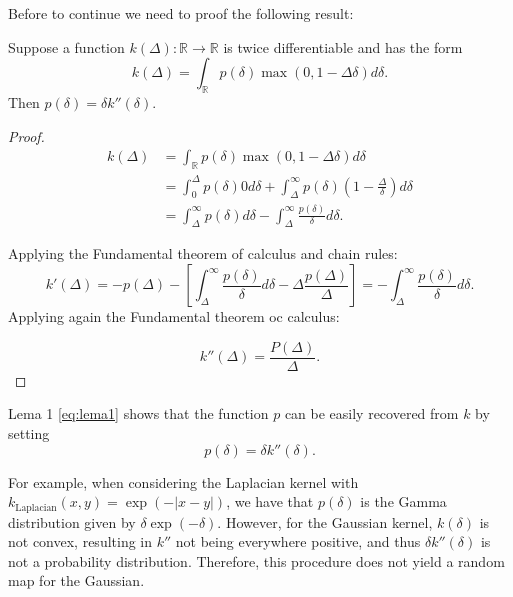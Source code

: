 Before to continue we need to proof the following result: 
\begin{lemma}
    \label{eq:lema1}
    Suppose a function $k(\Delta): \mathbb{R} \rightarrow \mathbb{R}$ is twice differentiable and has the form
    \begin{equation}
        k(\Delta) = \int_{\mathbb{R}} p(\delta) \max(0, 1-\Delta \delta) d\delta.
    \end{equation}
    Then $p(\delta) = \delta k''(\delta)$.
\end{lemma}
\begin{proof}
    \begin{align}
        k(\Delta) &= 
        \int_{\mathbb{R}} p(\delta) \max(0, 1-\Delta \delta) d\delta
        \\ 
        & = 
        \int_{0}^\Delta p(\delta) 0 d\delta
        + 
        \int_{\Delta}^\infty
            p(\delta)
            \left(1 - \frac{\Delta}{\delta}\right) 
            d \delta
        \\
        &=
        \int_{\Delta}^\infty
            p(\delta)
            d \delta
        -
        \int_{\Delta}^\infty
            \frac{p(\delta)}{\delta}
            d \delta. 
    \end{align}

Applying the Fundamental theorem of calculus and chain rules: 
\begin{equation}
   k'(\Delta)
   = 
   - p(\Delta)
   - 
   \left[
    \int_{\Delta}^\infty
            \frac{p(\delta)}{\delta}
            d \delta
    -
    \Delta \frac{p(\Delta)}{\Delta}
   \right] 
   = - \int_{\Delta}^\infty
   \frac{p(\delta)}{\delta}
   d \delta.
\end{equation}
Applying again the Fundamental theorem oc calculus: 

\begin{equation}
    k''(\Delta)
    = 
    \frac{P(\Delta)}{\Delta}. 
\end{equation}
\end{proof}


Lema 1 \ref{eq:lema1} shows that the function $p$ can be easily recovered from $k$ by setting 
\begin{equation}
    p(\delta) = \delta k''(\delta).   
\end{equation}

 For example, when considering the Laplacian kernel with $k_{\text{Laplacian}}(x, y) = \exp(-|x - y|)$, we have that $p(\delta)$ is the Gamma distribution given by $\delta \exp(-\delta)$. However, for the Gaussian kernel, $k(\delta)$ is not convex, resulting in $k''$ not being everywhere positive, and thus $\delta k''(\delta)$ is not a probability distribution. Therefore, this procedure does not yield a random map for the Gaussian.


